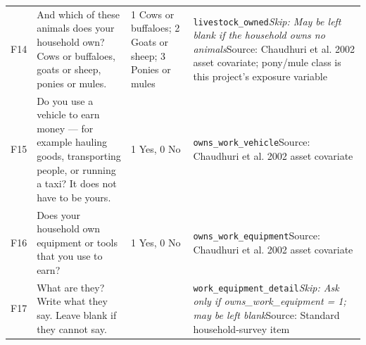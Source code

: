 \documentclass[10pt]{article}
\begin{document}
{\begin{longtable}{p{0.8cm}p{6.4cm}p{3.6cm}p{5.8cm}}
F14 & And which of these animals does your household own? Cows or buffaloes, goats or sheep, ponies or mules. & 1 Cows or buffaloes; 2 Goats or sheep; 3 Ponies or mules & \texttt{livestock\_owned}\newline \textit{Skip: May be left blank if the household owns no animals}\newline Source: Chaudhuri et al. 2002 asset covariate; pony/mule class is this project's exposure variable \\
F15 & Do you use a vehicle to earn money — for example hauling goods, transporting people, or running a taxi? It does not have to be yours. & 1 Yes, 0 No & \texttt{owns\_work\_vehicle}\newline Source: Chaudhuri et al. 2002 asset covariate \\
F16 & Does your household own equipment or tools that you use to earn? & 1 Yes, 0 No & \texttt{owns\_work\_equipment}\newline Source: Chaudhuri et al. 2002 asset covariate \\
F17 & What are they? Write what they say. Leave blank if they cannot say. &  & \texttt{work\_equipment\_detail}\newline \textit{Skip: Ask only if owns\_work\_equipment = 1; may be left blank}\newline Source: Standard household-survey item \\
\bottomrule
\end{longtable}
}
\end{document}
